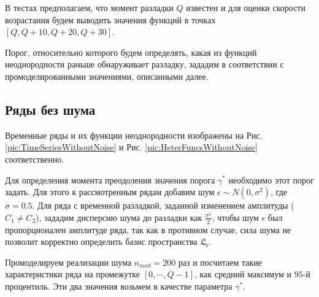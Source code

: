 \documentclass[specialist, substylefile = spbu.rtx,
			   subf, href, 12pt]{disser}
\begin{document}
В тестах предполагаем, что момент разладки $Q$ известен и для оценки скорости возрастания будем выводить значения функций в точках $[Q, Q+10, Q+20, Q+30]$.

Порог, относительно которого будем определять, какая из функций неоднородности раньше обнаруживает разладку, зададим в соответствии с промоделированными значениями, описанными далее.

\newpage

\subsection{Ряды без шума}

Временные ряды и их функции неоднородности изображены на Рис. \ref{pic:TimeSeriesWithoutNoise} и Рис. \ref{pic:HeterFuncsWithoutNoise} соответственно.

Для определения момента преодоления значения порога $ \gamma^* $ необходимо этот порог задать. Для этого к рассмотренным рядам добавим шум $\epsilon\sim N(0, \sigma^2)$, где $\sigma = 0.5$. Для ряда с временной разладкой, заданной изменением амплитуды ($C_1 \neq C_2$), зададим дисперсию шума до разладки как $\frac{\sigma^2}{2}$, чтобы шум $ \epsilon $ был пропорционален амплитуде ряда, так как в противном случае, сила шума не позволит корректно определить базис пространства $ \mathfrak{L_r} $. 

Промоделируем реализации шума $n_{mod}=200$ раз и посчитаем такие характеристики ряда на промежутке $[0, \cdots, Q-1]$, как средний максимум и $95$-й процентиль. Эти два значения возьмем в качестве параметра $ \gamma^* $. 
\end{document}
